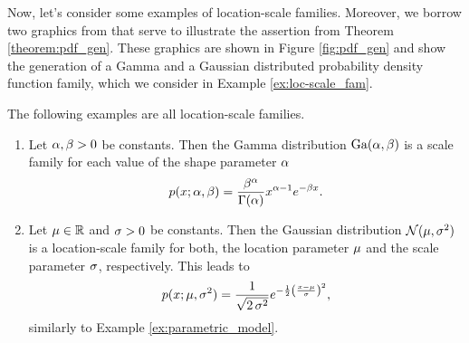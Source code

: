 Now, let's consider some examples of location-scale families. Moreover, we borrow two graphics from \cite{cinelli2021variational} that serve to illustrate the assertion from Theorem \ref{theorem:pdf_gen}. These graphics are shown in Figure \ref{fig:pdf_gen} and show the generation of a Gamma and a Gaussian distributed probability density function family, which we consider in Example \ref{ex:loc-scale_fam}.

\begin{example}\label{ex:loc-scale_fam}
The following examples are all location-scale families.
\begin{enumerate}
\item Let $\alpha,\beta >0$ be constants. Then the Gamma distribution $\text{Ga}(\alpha,\beta)$ is a scale family for each value of the shape parameter $\alpha$
\begin{align*}
p(x;\alpha,\beta) = \frac{\beta^\alpha}{\Gamma(\alpha)}x^{\alpha-1} e^{-\beta x}.
\end{align*}
\item Let $\operatorname{\mu}\in\operatorname{\mathbb{R}}$ and $\operatorname{\sigma}>0$ be constants. Then the Gaussian distribution $\mathcal{N}(\operatorname{\mu},\operatorname{\sigma}^2)$ is a location-scale family for both, the location parameter $\operatorname{\mu}$ and the scale parameter $\operatorname{\sigma}$, respectively. This leads to
\begin{align*}
p(x; \operatorname{\mu}, \operatorname{\sigma}^2) = \frac{1}{\sqrt{2\operatorname{\sigma}^2}} e^{-\frac{1}{2} \left( \frac{x-\operatorname{\mu}}{\operatorname{\sigma}} \right)^2},
\end{align*}
similarly to Example \ref{ex:parametric_model}.
\end{enumerate}
\end{example}

